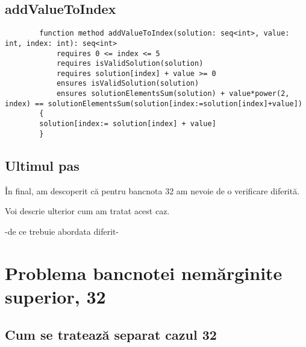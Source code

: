     \subsection{addValueToIndex}
    \begin{lstlisting}
        function method addValueToIndex(solution: seq<int>, value: int, index: int): seq<int>
            requires 0 <= index <= 5
            requires isValidSolution(solution)
            requires solution[index] + value >= 0
            ensures isValidSolution(solution)
            ensures solutionElementsSum(solution) + value*power(2, index) == solutionElementsSum(solution[index:=solution[index]+value])
        {
        solution[index:= solution[index] + value]
        }
    \end{lstlisting}

    
    \subsection{Ultimul pas}
    În final, am descoperit că pentru bancnota 32 am nevoie de o verificare diferită.\par
    Voi descrie ulterior cum am tratat acest caz.\par
    -de ce trebuie abordata diferit- 
    
    
    
\section{Problema bancnotei nemărginite superior, 32}

\subsection{Cum se tratează separat cazul 32}

